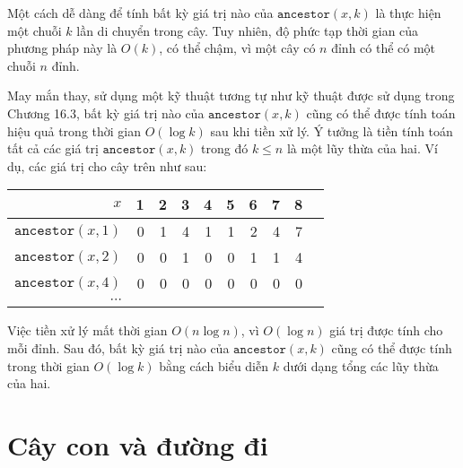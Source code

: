 Một cách dễ dàng để tính bất kỳ giá trị nào của $\texttt{ancestor}(x,k)$
là thực hiện một chuỗi $k$ lần di chuyển trong cây.
Tuy nhiên, độ phức tạp thời gian của phương pháp này
là $O(k)$, có thể chậm, vì một cây có $n$
đỉnh có thể có một chuỗi $n$ đỉnh.

May mắn thay, sử dụng một kỹ thuật tương tự như kỹ thuật
được sử dụng trong Chương 16.3, bất kỳ giá trị nào của $\texttt{ancestor}(x,k)$
cũng có thể được tính toán hiệu quả trong thời gian $O(\log k)$
sau khi tiền xử lý.
Ý tưởng là tiền tính toán tất cả các giá trị $\texttt{ancestor}(x,k)$
trong đó $k \le n$ là một lũy thừa của hai.
Ví dụ, các giá trị cho cây trên
như sau:

\begin{center}
\begin{tabular}{r|rrrrrrrrr}
$x$ & 1 & 2 & 3 & 4 & 5 & 6 & 7 & 8 \\
\hline
$\texttt{ancestor}(x,1)$ & 0 & 1 & 4 & 1 & 1 & 2 & 4 & 7 \\
$\texttt{ancestor}(x,2)$ & 0 & 0 & 1 & 0 & 0 & 1 & 1 & 4 \\
$\texttt{ancestor}(x,4)$ & 0 & 0 & 0 & 0 & 0 & 0 & 0 & 0 \\
$\cdots$ \\
\end{tabular}
\end{center}

Việc tiền xử lý mất thời gian $O(n \log n)$,
vì $O(\log n)$ giá trị được tính cho mỗi đỉnh.
Sau đó, bất kỳ giá trị nào của $\texttt{ancestor}(x,k)$ cũng có thể được tính
trong thời gian $O(\log k)$ bằng cách biểu diễn $k$
dưới dạng tổng các lũy thừa của hai.

\section{Cây con và đường đi}


